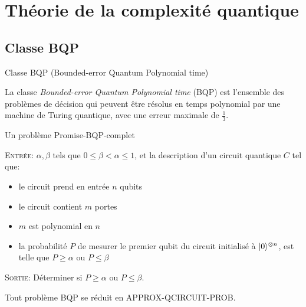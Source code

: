 \documentclass[aspectratio=169]{beamer}
\theoremstyle{plain}
\theoremstyle{definition}
\DeclarePairedDelimiter\ket{\lvert}{\rangle}
\begin{document}
\section{Théorie de la complexité quantique}
\subsection{Classe BQP}
\begin{frame}{Classe BQP (Bounded-error Quantum Polynomial time)}
    \begin{definition}[BQP] 
        La classe \emph{Bounded-error Quantum Polynomial time} (BQP) est l'ensemble des problèmes de décision qui peuvent être résolus en temps polynomial par une machine de Turing quantique, avec une erreur maximale de $\frac{1}{3}$. 
    \end{definition}
\end{frame}

\begin{frame}{Un problème Promise-BQP-complet}
    \begin{definition}
        \textsc{Entrée}: $\alpha, \beta$ tels que $0\leq\beta<\alpha\leq 1$, et la description d'un circuit quantique $C$ tel que:
        \begin{itemize}[label=--, noitemsep]
            \item le circuit prend en entrée $n$ qubits
            \item le circuit contient $m$ portes
            \item $m$ est polynomial en $n$
            \item la probabilité $P$ de mesurer le premier qubit du circuit initialisé à $\ket{0}^{\otimes n}$, est telle que $P\geq\alpha$ ou $P\leq\beta$
        \end{itemize}
        \textsc{Sortie}: Déterminer si $P\geq\alpha$ ou $P\leq\beta$.
    \end{definition}

    \begin{theorem}[Complétude]
        Tout problème BQP se réduit en APPROX-QCIRCUIT-PROB.
    \end{theorem}
\end{frame}
\end{document}
